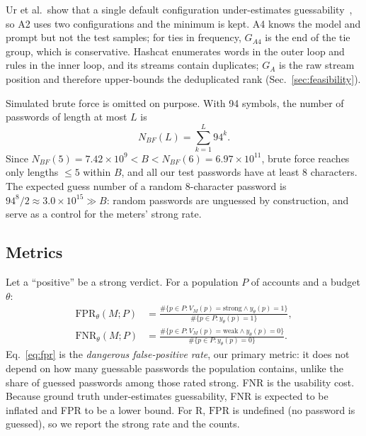 \documentclass[conference]{IEEEtran}
\newcommand{\FPR}{\mathrm{FPR}}
\newcommand{\FNR}{\mathrm{FNR}}
\begin{document}
Ur et al.\ show that a single default configuration under-estimates guessability~\cite{ur2015}, so A2 uses two configurations and the minimum is kept. A4 knows the model and prompt but not the test samples; for ties in frequency, $G_{A4}$ is the end of the tie group, which is conservative. Hashcat enumerates words in the outer loop and rules in the inner loop, and its streams contain duplicates; $G_A$ is the raw stream position and therefore upper-bounds the deduplicated rank (Sec.~\ref{sec:feasibility}).

Simulated brute force is omitted on purpose. With 94 symbols, the number of passwords of length at most $L$ is
\begin{equation}\label{eq:bf}
N_{BF}(L)=\sum_{k=1}^{L}94^{k}.
\end{equation}
Since $N_{BF}(5)=7.42{\times}10^{9}<B<N_{BF}(6)=6.97{\times}10^{11}$, brute force reaches only lengths $\le5$ within $B$, and all our test passwords have at least 8 characters. The expected guess number of a random 8-character password is $94^8/2\approx3.0{\times}10^{15}\gg B$: random passwords are unguessed by construction, and serve as a control for the meters' strong rate.

\subsection{Metrics}
Let a ``positive'' be a strong verdict. For a population $P$ of accounts and a budget $\theta$:
\begin{align}
\FPR_\theta(M;P)&=\frac{\#\{p\in P:V_M(p)=\text{strong}\wedge y_\theta(p)=1\}}{\#\{p\in P:y_\theta(p)=1\}},\label{eq:fpr}\\
\FNR_\theta(M;P)&=\frac{\#\{p\in P:V_M(p)=\text{weak}\wedge y_\theta(p)=0\}}{\#\{p\in P:y_\theta(p)=0\}}.\label{eq:fnr}
\end{align}
Eq.~\eqref{eq:fpr} is the \emph{dangerous false-positive rate}, our primary metric: it does not depend on how many guessable passwords the population contains, unlike the share of guessed passwords among those rated strong. FNR is the usability cost. Because ground truth under-estimates guessability, FNR is expected to be inflated and FPR to be a lower bound. For R, $\FPR$ is undefined (no password is guessed), so we report the strong rate and the counts.
\end{document}
